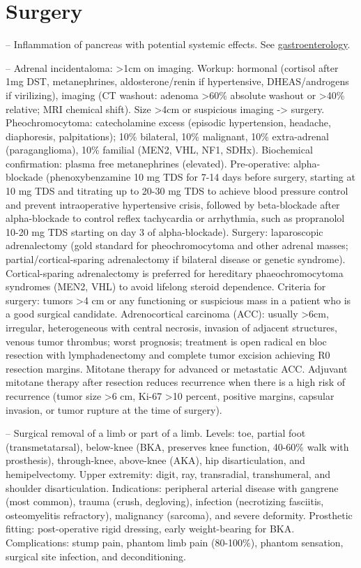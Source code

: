 \chapter{Surgery}

-- Inflammation of pancreas with potential systemic effects. See \hyperlink{Gastroenterology}{gastroenterology}.

-- Adrenal incidentaloma: >1cm on imaging. Workup: hormonal (cortisol after 1mg DST, metanephrines, aldosterone/renin if hypertensive, DHEAS/androgens if virilizing), imaging (CT washout: adenoma >60\% absolute washout or >40\% relative; MRI chemical shift). Size >4cm or suspicious imaging -> surgery. Pheochromocytoma: catecholamine excess (episodic hypertension, headache, diaphoresis, palpitations); 10\% bilateral, 10\% malignant, 10\% extra-adrenal (paraganglioma), 10\% familial (MEN2, VHL, NF1, SDHx). Biochemical confirmation: plasma free metanephrines (elevated). Pre-operative: alpha-blockade (phenoxybenzamine 10 mg TDS for 7-14 days before surgery, starting at 10 mg TDS and titrating up to 20-30 mg TDS to achieve blood pressure control and prevent intraoperative hypertensive crisis, followed by beta-blockade after alpha-blockade to control reflex tachycardia or arrhythmia, such as propranolol 10-20 mg TDS starting on day 3 of alpha-blockade). Surgery: laparoscopic adrenalectomy (gold standard for pheochromocytoma and other adrenal masses; partial/cortical-sparing adrenalectomy if bilateral disease or genetic syndrome). Cortical-sparing adrenalectomy is preferred for hereditary phaeochromocytoma syndromes (MEN2, VHL) to avoid lifelong steroid dependence. Criteria for surgery: tumors >4 cm or any functioning or suspicious mass in a patient who is a good surgical candidate. Adrenocortical carcinoma (ACC): usually >6cm, irregular, heterogeneous with central necrosis, invasion of adjacent structures, venous tumor thrombus; worst prognosis; treatment is open radical en bloc resection with lymphadenectomy and complete tumor excision achieving R0 resection margins. Mitotane therapy for advanced or metastatic ACC. Adjuvant mitotane therapy after resection reduces recurrence when there is a high risk of recurrence (tumor size >6 cm, Ki-67 >10 percent, positive margins, capsular invasion, or tumor rupture at the time of surgery).

-- Surgical removal of a limb or part of a limb. Levels: toe, partial foot (transmetatarsal), below-knee (BKA, preserves knee function, 40-60\% walk with prosthesis), through-knee, above-knee (AKA), hip disarticulation, and hemipelvectomy. Upper extremity: digit, ray, transradial, transhumeral, and shoulder disarticulation. Indications: peripheral arterial disease with gangrene (most common), trauma (crush, degloving), infection (necrotizing fasciitis, osteomyelitis refractory), malignancy (sarcoma), and severe deformity. Prosthetic fitting: post-operative rigid dressing, early weight-bearing for BKA. Complications: stump pain, phantom limb pain (80-100\%), phantom sensation, surgical site infection, and deconditioning.

